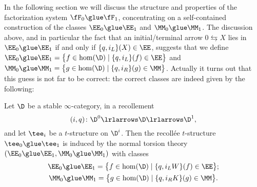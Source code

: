 In the following section we will discuss the structure and properties of the factorization system $\fF_0\glue \fF_1$, concentrating on a self-contained %
 construction of the classes $\EE_0\glue\EE_1$ and $\MM_0\glue\MM_1$.%
The discussion above, and in particular the fact that an initial/terminal arrow $0\leftrightarrows X$ lies in $\EE_0\glue\EE_1$ if and only if $\{q, i_L\}(X)\in \EE$, suggests that we define
$\EE_0\glue\EE_1 = \big\{f\in\hom(\D)\mid 
\{q, i_L\}(f)\in \EE 
\big\}$ and $\MM_0\glue\MM_1 = \big\{g\in\hom(\D)\mid 
\{q, i_R\}(g) \in \MM
\big\}$. Actually it turns out that this guess is not far to be correct: the correct classes are indeed given by the following: 
\begin{theorem}
\label{thm:trueglued}
Let $\D$ be a stable $\infty$-category, in a recollement 
$$
(i,q)\colon \D^0 \lrlarrows  \D  \lrlarrows  \D^1,
$$
and let $\tee_i$ be a $t$-structure on $\D^i$. Then the recoll\'ee $t$-structure $\tee_0\glue \tee_1$ is induced by the normal torsion theory $(\EE_0\glue\EE_1,\MM_0\glue\MM_1)$ with classes
\begin{gather}
\EE_0\glue\EE_1 = \big\{f\in\hom(\D)\mid 
\{q, i_LW\}(f)\in \EE 
\big\};\label{BBDleftclass}\\
\MM_0\glue\MM_1 = \big\{g\in\hom(\D)\mid 
\{q, i_RK\}(g) \in \MM
\big\}.
\end{gather}
\end{theorem}
